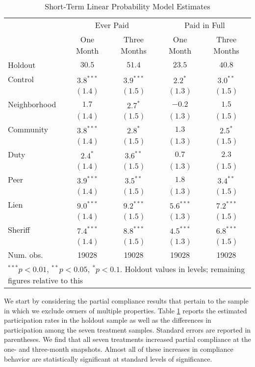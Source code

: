 \documentclass[12pt]{article}
\begin{document}
\begin{table}[ht]
\centering
\caption{Short-Term Linear Probability Model Estimates} \label{pc_lin}
\bigskip
\begin{tabular}{l c c c c }
\hline
 & \multicolumn{2}{c}{Ever Paid} & \multicolumn{2}{c}{Paid in Full} \\
          & One Month & Three Months & One Month & Three Months \\
Holdout   & $30.5$ & $51.4$ & $23.5$ & $40.8$ \\
\hline
Control   & $3.8^{***}$  & $3.9^{***}$  & $2.2^{*}$    & $3.0^{**}$   \\
          & $(1.4)$      & $(1.5)$      & $(1.3)$      & $(1.5)$      \\
Neighborhood & $1.7$        & $2.7^{*}$    & $-0.2$       & $1.5$        \\
          & $(1.4)$      & $(1.5)$      & $(1.3)$      & $(1.5)$      \\
Community     & $3.8^{***}$  & $2.8^{*}$    & $1.3$        & $2.5^{*}$    \\
          & $(1.4)$      & $(1.5)$      & $(1.3)$      & $(1.5)$      \\
Duty      & $2.4^{*}$    & $3.6^{**}$   & $0.7$        & $2.3$        \\
          & $(1.4)$      & $(1.5)$      & $(1.3)$      & $(1.5)$      \\
Peer      & $3.9^{***}$  & $3.5^{**}$   & $1.8$        & $3.4^{**}$   \\
          & $(1.4)$      & $(1.5)$      & $(1.3)$      & $(1.5)$      \\
Lien      & $9.0^{***}$  & $9.2^{***}$  & $5.6^{***}$  & $7.2^{***}$  \\
          & $(1.4)$      & $(1.5)$      & $(1.3)$      & $(1.5)$      \\
Sheriff   & $7.4^{***}$  & $8.8^{***}$  & $4.5^{***}$  & $6.8^{***}$  \\
          & $(1.4)$      & $(1.5)$      & $(1.3)$      & $(1.5)$      \\
\hline
Num. obs. & 19028        & 19028        & 19028        & 19028        \\
\hline
\multicolumn{5}{l}{\scriptsize{$^{***}p<0.01$, $^{**}p<0.05$,
    $^*p<0.1$. Holdout values in levels; remaining figures relative to
    this}}
\end{tabular}
\end{table}

We start by considering the partial compliance results that pertain to
the sample in which we exclude owners of multiple properties.  Table
\ref{pc_lin} reports the estimated participation rates in the holdout
sample as well as the differences in participation among the seven
treatment samples. Standard errors are reported in
parentheses. We find that all seven treatments increased partial
compliance at the one- and three-month snapshots. Almost all of these
increases in compliance behavior are statistically significant at
standard levels of significance.
\end{document}
